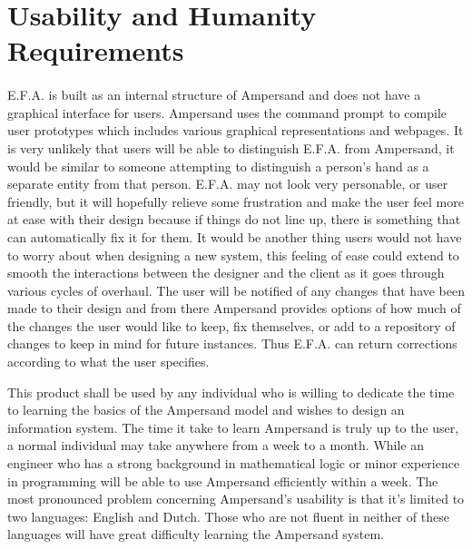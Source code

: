\documentclass[12pt]{report}
\begin{document}
\section{Usability and Humanity Requirements}\label{sec:Usability}
\paragraph*{}
E.F.A. is built as an internal structure of Ampersand and does not have a graphical interface for 
users. Ampersand uses the command prompt to compile user prototypes which includes various 
graphical representations and webpages. It is very unlikely that users will be able to distinguish 
E.F.A. from Ampersand, it would be similar to someone attempting to distinguish a person’s hand as 
a separate entity from that person. E.F.A. may not look very personable, or user friendly, but it 
will hopefully relieve some frustration and make the user feel more at ease with their design 
because if things do not line up, there is something that can automatically fix it for them. It 
would be another thing users would not have to worry about when designing a new system, this 
feeling of ease could extend to smooth the interactions between the designer and the client as it 
goes through various cycles of overhaul. The user will be notified of any changes that have been 
made to their design and from there Ampersand provides options of how much of the changes the user 
would like to keep, fix themselves, or add to a repository of changes to keep in mind for future 
instances. Thus E.F.A. can return corrections according to what the user specifies.

This product shall be used by any individual who is willing to dedicate the time to learning the 
basics of the Ampersand model and wishes to design an information system. The time it take to learn 
Ampersand is truly up to the user, a normal individual may take anywhere from a week to a month. 
While an engineer who has a strong background in mathematical logic or minor experience in 
programming will be able to use Ampersand efficiently within a week. The most pronounced problem 
concerning Ampersand’s usability is that it’s limited to two languages: English and Dutch. Those 
who are not fluent in neither of these languages will have great difficulty learning the Ampersand 
system.
\end{document}
